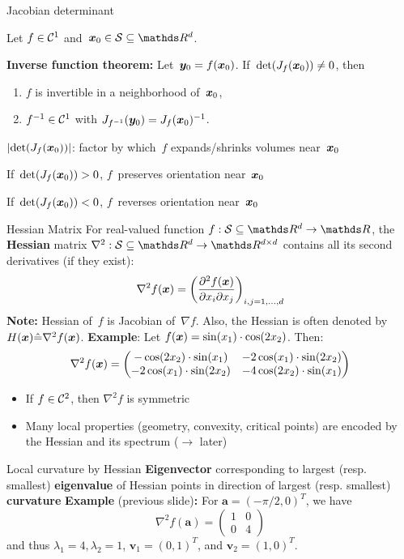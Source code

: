 \documentclass[11pt,compress,t,notes=noshow, xcolor=table]{beamer}
\begin{document}
\begin{framei}{Jacobian determinant}
\item Let $f\in\mathcal{C}^{1}$ and~$\xv_0\in\mathcal{S}\subseteq \R^d$.
\item \textbf{Inverse function theorem:} Let~$\bm{y}_0=f(\bm{x}_0)$. If~$\det(J_f(\bm{x}_0))\not=0$, then
\begin{enumerate}
\item $f$ is invertible in a neighborhood of~$\bm{x}_0$,
\item $f^{-1}\in\mathcal{C}^{1}$ with $J_{f^{-1}}(\bm{y}_0) = J_f(\bm{x}_0)^{-1}$.
\end{enumerate}
\item $|{\det(J_f(\bm{x}_0))}|$: factor by which~$f$ expands/shrinks volumes near~$\bm{x}_0$
\item If~$\det(J_f(\bm{x}_0))>0$, $f$~preserves orientation near~$\bm{x}_0$
\item If~$\det(J_f(\bm{x}_0))<0$, $f$~reverses orientation near~$\bm{x}_0$
\end{framei}


\begin{framev}{Hessian Matrix}
For real-valued function $f:\mathcal{S}\subseteq \R^d \to \R$, the \textbf{Hessian} matrix $\nabla^2:\mathcal{S}\subseteq \R^d \to \R^{d \times d}$ contains all its second derivatives (if they exist):
$$
\nabla^2 f(\bm{x}) = \left(\frac{\partial^2 f(\bm{x})}{\partial x_i \partial x_j}\right)_{i,j=1,\ldots,d}
$$
\textbf{Note:} Hessian of~$f$ is Jacobian of~$\nabla f$. Also, the Hessian is often denoted by $H(\bm{x})\hat{=}\nabla^2 f(\bm{x})$.
\spacer
\textbf{Example}: Let $f(\bm{x}) = \sin(x_1) \cdot \cos(2x_2)$.
Then:
$$
\nabla^2 f(\bm{x}) = \begin{pmatrix}
-\cos(2x_2)\cdot\sin(x_1) & -2\cos(x_1)\cdot\sin(2x_2) \\
-2\cos(x_1)\cdot\sin(2x_2) & -4\cos(2x_2)\cdot\sin(x_1)
\end{pmatrix}
$$
\begin{itemize}
\item If $f\in\mathcal{C}^{2}$, then $\nabla^2 f$ is symmetric
\item Many local properties (geometry, convexity, critical points) are encoded by the Hessian and its spectrum ($\rightarrow$ later)
\end{itemize}
\end{framev}


\begin{framev}{Local curvature by Hessian}
\textbf{Eigenvector} corresponding to largest (resp. smallest) \textbf{eigenvalue} of Hessian points in direction of largest (resp. smallest) \textbf{curvature}
\spacer
\textbf{Example} (previous slide)\textbf{:}
For $\bm{a}=(-\pi/2,0)^T$, we have
$$
\nabla^2 f(\bm{a}) = \begin{pmatrix}
1 & 0 \\ 0 & 4
\end{pmatrix}
$$
and thus $\lambda_{1}=4, \lambda_{2}=1$, $\bm{v}_{1}=(0, 1)^T$, and $\bm{v}_{2}=(1, 0)^T$.
\vfill
{}
\end{framev}
\end{document}
